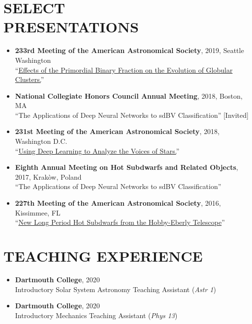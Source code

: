 \documentclass[margin, 10pt]{res} %
\begin{document}
\begin{resume}
\section{SELECT\\PRESENTATIONS}
\begin{itemize}
\item {\scriptsize \textbf{233rd Meeting of the American Astronomical Society}}, {\small 2019, Seattle Washington}\\ ``\href{https://ui.adsabs.harvard.edu/#abs/2019AAS...23324909B/abstract}{Effects of the Primordial Binary Fraction on the Evolution of Globular Clusters.}''
\item {\scriptsize \textbf{National Collegiate Honors Council Annual Meeting}}, {\small 2018, Boston, MA}\\ ``The Applications of Deep Neural Networks to sdBV Classification'' {\footnotesize [Invited]}
\item \textbf{{\scriptsize 231st Meeting of the American Astronomical Society}}, {\small 2018, Washington D.C.}\\``\href{https://ui.adsabs.harvard.edu/#abs/2018AAS...23115029B/abstract}{Using Deep Learning to Analyze the Voices of Stars.}''
\item {\scriptsize \textbf{Eighth Annual Meeting on Hot Subdwarfs and Related Objects}}, {\small 2017, Krak\`ow, Poland}\\ ``The Applications of Deep Neural Networks to sdBV Classification''
\item \textbf{{\scriptsize 227th Meeting of the American Astronomical Society}}, {\small 2016, Kissimmee, FL}\\``\href{https://ui.adsabs.harvard.edu/#abs/2016AAS...22734412B/abstract}{New Long Period Hot Subdwarfs from the Hobby-Eberly Telescope}''
\end{itemize}

\section{TEACHING EXPERIENCE}
\begin{itemize}
	\item {\scriptsize \textbf{Dartmouth College}}, {\small 2020} \\ Introductory Solar System Astronomy Teaching Assistant (\textit{Astr 1})
	\item {\scriptsize \textbf{Dartmouth College}}, {\small 2020} \\ Introductory Mechanics Teaching Assistant (\textit{Phys 13})
\end{itemize}


\end{resume}
\end{document}
